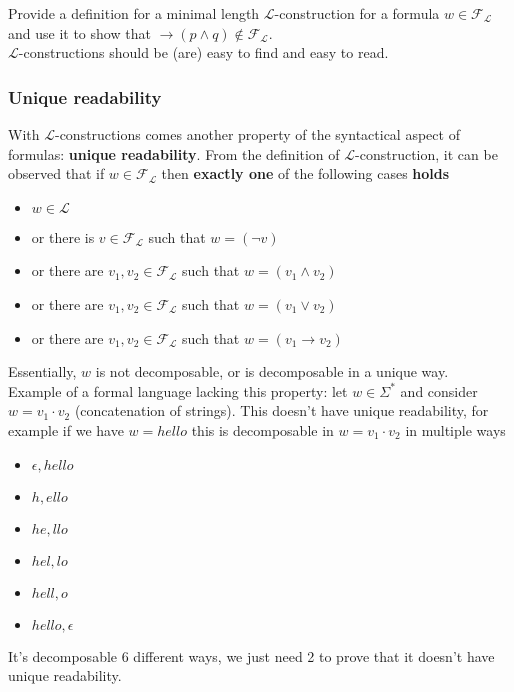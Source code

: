 \documentclass[11pt]{article}
\begin{document}
	Provide a definition for a minimal length $\mathcal{L}$-construction for a formula $w \in \mathcal{F}_{\mathcal{L}}$ and use it to show that $\rightarrow (p \wedge q) \notin \mathcal{F}_{\mathcal{L}}$.\\
	
	$\mathcal{L}$-constructions should be (are) easy to find and easy to read.\\
	
	\newpage
	
	\subsubsection{Unique readability}
	With $\mathcal{L}$-constructions comes another property of the syntactical aspect of formulas: \textbf{unique readability}. From the definition of $\mathcal{L}$-construction, it can be observed that if $w \in \mathcal{F}_{\mathcal{L}}$ then \textbf{exactly one} of the following cases \textbf{holds}
	\begin{itemize}
		\item $w \in \mathcal{L}$
		\item or there is $v \in \mathcal{F}_{\mathcal{L}}$ such that $w = (\neg v)$
		\item or there are $v_1, v_2 \in \mathcal{F}_{\mathcal{L}}$ such that $w = (v_1 \wedge v_2)$
		\item or there are $v_1, v_2 \in \mathcal{F}_{\mathcal{L}}$ such that $w = (v_1 \vee v_2)$
		\item or there are $v_1, v_2 \in \mathcal{F}_{\mathcal{L}}$ such that $w = (v_1 \rightarrow v_2)$
	\end{itemize}
	Essentially, $w$ is not decomposable, or is decomposable in a unique way.\\
	
	Example of a formal language lacking this property: let $w \in \Sigma^\ast$ and consider $w = v_1 \cdot v_2$ (concatenation of strings). This doesn't have unique readability, for example if we have $w = hello$ this is decomposable in $w = v_1 \cdot v_2$ in multiple ways
	\begin{itemize}
		\item $\epsilon, hello$
		\item $h, ello$
		\item $he, llo$
		\item $hel, lo$
		\item $hell, o$
		\item $hello, \epsilon$
	\end{itemize}
	It's decomposable 6 different ways, we just need 2 to prove that it doesn't have unique readability.\\
	
\end{document}
